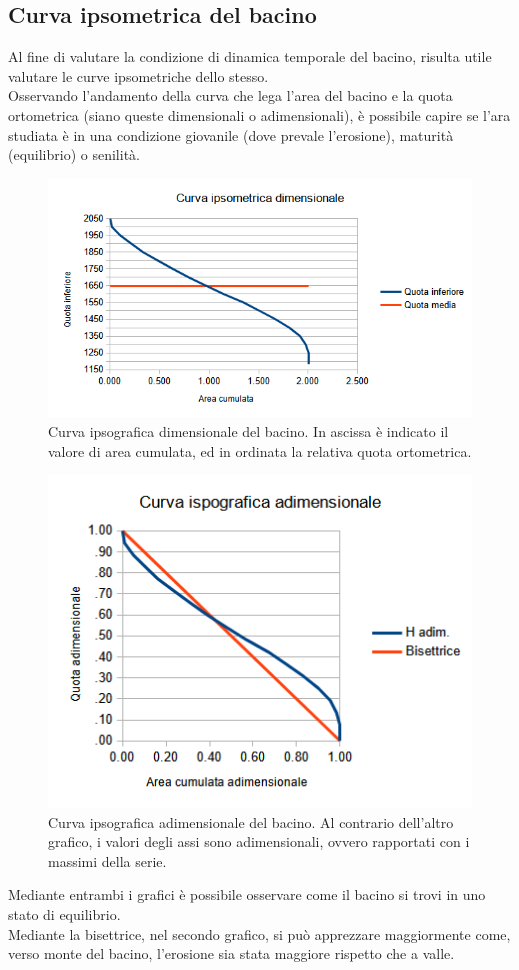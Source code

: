 \subsection{Curva ipsometrica del bacino}
Al fine di valutare la condizione di dinamica temporale del bacino, risulta utile valutare le curve ipsometriche dello stesso.\\
Osservando l'andamento della curva che lega l'area del bacino e la quota ortometrica (siano queste dimensionali o adimensionali), è possibile capire se l'ara studiata è in una condizione giovanile (dove prevale l'erosione), maturità (equilibrio) o senilità.
\begin{figure}[H] \centering
          \includegraphics[scale=0.7]{immagini/curva_ipsografica_dimens.png}
        \caption{Curva ipsografica dimensionale del bacino. In ascissa è indicato il valore di area cumulata, ed in ordinata la relativa quota ortometrica.}
\label{curva_ipsometrica_dimensionale}
\end{figure}    
\begin{figure}[H] \centering
        \includegraphics[scale=0.8]{immagini/curva_ipsografica_adimens.png}
        \caption{Curva ipsografica adimensionale del bacino. Al contrario dell'altro grafico, i valori degli assi sono adimensionali, ovvero rapportati con i massimi della serie.}
\end{figure}
Mediante entrambi i grafici è possibile osservare come il bacino si trovi in uno stato di equilibrio.\\
Mediante la bisettrice, nel secondo grafico, si può apprezzare maggiormente come, verso monte del bacino, l'erosione sia stata maggiore rispetto che a valle.

